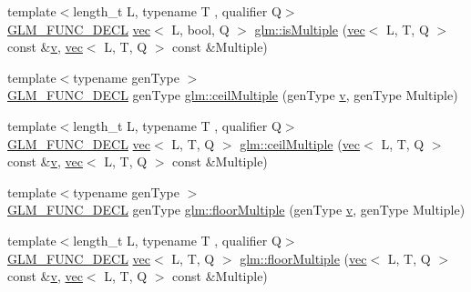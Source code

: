 \begin{DoxyCompactItemize}
\item 
{\footnotesize template$<$length\+\_\+t L, typename T , qualifier Q$>$ }\\\mbox{\hyperlink{setup_8hpp_ab2d052de21a70539923e9bcbf6e83a51}{G\+L\+M\+\_\+\+F\+U\+N\+C\+\_\+\+D\+E\+CL}} \mbox{\hyperlink{structglm_1_1vec}{vec}}$<$ L, bool, Q $>$ \mbox{\hyperlink{group__gtc__round_gabb4360e38c0943d8981ba965dead519d}{glm\+::is\+Multiple}} (\mbox{\hyperlink{structglm_1_1vec}{vec}}$<$ L, T, Q $>$ const \&\mbox{\hyperlink{_s_d_l__opengl_8h_a10a82eabcb59d2fcd74acee063775f90}{v}}, \mbox{\hyperlink{structglm_1_1vec}{vec}}$<$ L, T, Q $>$ const \&Multiple)
\item 
{\footnotesize template$<$typename gen\+Type $>$ }\\\mbox{\hyperlink{setup_8hpp_ab2d052de21a70539923e9bcbf6e83a51}{G\+L\+M\+\_\+\+F\+U\+N\+C\+\_\+\+D\+E\+CL}} gen\+Type \mbox{\hyperlink{group__gtc__round_ga1d89ac88582aaf4d5dfa5feb4a376fd4}{glm\+::ceil\+Multiple}} (gen\+Type \mbox{\hyperlink{_s_d_l__opengl_8h_a10a82eabcb59d2fcd74acee063775f90}{v}}, gen\+Type Multiple)
\item 
{\footnotesize template$<$length\+\_\+t L, typename T , qualifier Q$>$ }\\\mbox{\hyperlink{setup_8hpp_ab2d052de21a70539923e9bcbf6e83a51}{G\+L\+M\+\_\+\+F\+U\+N\+C\+\_\+\+D\+E\+CL}} \mbox{\hyperlink{structglm_1_1vec}{vec}}$<$ L, T, Q $>$ \mbox{\hyperlink{group__gtc__round_gab77fdcc13f8e92d2e0b1b7d7aeab8e9d}{glm\+::ceil\+Multiple}} (\mbox{\hyperlink{structglm_1_1vec}{vec}}$<$ L, T, Q $>$ const \&\mbox{\hyperlink{_s_d_l__opengl_8h_a10a82eabcb59d2fcd74acee063775f90}{v}}, \mbox{\hyperlink{structglm_1_1vec}{vec}}$<$ L, T, Q $>$ const \&Multiple)
\item 
{\footnotesize template$<$typename gen\+Type $>$ }\\\mbox{\hyperlink{setup_8hpp_ab2d052de21a70539923e9bcbf6e83a51}{G\+L\+M\+\_\+\+F\+U\+N\+C\+\_\+\+D\+E\+CL}} gen\+Type \mbox{\hyperlink{group__gtc__round_ga2ffa3cd5f2ea746ee1bf57c46da6315e}{glm\+::floor\+Multiple}} (gen\+Type \mbox{\hyperlink{_s_d_l__opengl_8h_a10a82eabcb59d2fcd74acee063775f90}{v}}, gen\+Type Multiple)
\item 
{\footnotesize template$<$length\+\_\+t L, typename T , qualifier Q$>$ }\\\mbox{\hyperlink{setup_8hpp_ab2d052de21a70539923e9bcbf6e83a51}{G\+L\+M\+\_\+\+F\+U\+N\+C\+\_\+\+D\+E\+CL}} \mbox{\hyperlink{structglm_1_1vec}{vec}}$<$ L, T, Q $>$ \mbox{\hyperlink{group__gtc__round_gacdd8901448f51f0b192380e422fae3e4}{glm\+::floor\+Multiple}} (\mbox{\hyperlink{structglm_1_1vec}{vec}}$<$ L, T, Q $>$ const \&\mbox{\hyperlink{_s_d_l__opengl_8h_a10a82eabcb59d2fcd74acee063775f90}{v}}, \mbox{\hyperlink{structglm_1_1vec}{vec}}$<$ L, T, Q $>$ const \&Multiple)

\end{DoxyCompactItemize}
